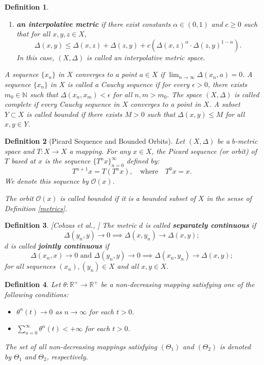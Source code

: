 \documentclass[pdflatex,sn-mathphys-num]{sn-jnl}%
\theoremstyle{thmstyleone}%
\theoremstyle{thmstyletwo}%
\theoremstyle{thmstylethree}%
\newtheorem{definition}{Definition}%
\begin{document}
\begin{definition}
\begin{enumerate}[resume]
    In this case, \( (X, \Delta) \) is called a strong \( b \)-suprametric space.
    \item \textbf{an interpolative metric} if there exist constants \( \alpha \in (0, 1) \) and \( c \geq 0 \) such that for all \( x, y, z \in X \),
    \[
    \Delta(x, y) \leq \Delta(x, z) + \Delta(z, y) + c \left( \Delta(x, z)^\alpha \cdot \Delta(z, y)^{1-\alpha} \right).
    \]
    In this case, \( (X, \Delta) \) is called an interpolative metric space.
\end{enumerate}
A sequence \( \{x_n\} \) in \( X \) converges to a point \( a \in X \) if \( \lim_{n \to \infty} \Delta(x_n, a) = 0 \). A sequence \( \{x_n\} \) in \( X \) is called a Cauchy sequence if for every \( \epsilon > 0 \), there exists \( m_0 \in \mathbb{N} \) such that \( \Delta(x_n, x_m) < \epsilon \) for all \( n, m > m_0 \). The space \( (X, \Delta) \) is called complete if every Cauchy sequence in \( X \) converges to a point in \( X \). A subset $Y\subset X$ is called bounded if there exists $M>0$ such that $\Delta(x,y)\leq M$ for all $x,y\in Y$.
\end{definition}
\begin{definition}[Picard Sequence and Bounded Orbits]
Let $(X,\Delta)$ be a $b$-metric space and $T: X\to X$ a mapping. For any $x \in X$, the \emph{Picard sequence} (or \emph{orbit}) of $T$ based at $x$ is the sequence $\{T^n x\}_{n=0}^\infty$ defined by:
\[
T^{n+1}x = T(T^n x), \quad \text{where} \quad T^0 x = x.
\]
We denote this sequence by $\mathcal{O}(x)$. 

The orbit $\mathcal{O}(x)$ is called \emph{bounded} if it is a bounded subset of $X$ in the sense of Definition \ref{metrics}. 
\end{definition}
\begin{definition}\label{continuity}[Cobzas et al., \cite{cobzas2020completion}]
The metric \( d \) is called \textbf{separately continuous} if
\[
\Delta(y_n, y) \to 0 \implies \Delta(x, y_n) \to \Delta(x, y);
\]
\( d \) is called \textbf{jointly continuous} if
\[
\Delta(x_n, x) \to 0 \text{ and } \Delta(y_n, y) \to 0 \implies \Delta(x_n, y_n) \to \Delta(x, y);
\]
for all sequences \( (x_n), (y_n) \in X \) and all \( x, y \in X \).
\end{definition}

\begin{definition}
Let \( \theta : \mathbb{R}^{+} \to \mathbb{R}^{+} \) be a non-decreasing mapping satisfying one of the following conditions:
\begin{itemize}
    \item[\((\Theta_1)\)] \( \theta^{n}(t) \to 0 \) as \( n \to \infty \) for each \( t > 0 \).
    \item[\((\Theta_2)\)] \( \sum_{n=0}^{\infty} \theta^{n}(t) < +\infty \) for each \( t > 0 \).
\end{itemize}
The set of all non-decreasing mappings satisfying \( (\Theta_1) \) and \( (\Theta_2) \) is denoted by \( \Theta_1 \) and \( \Theta_2 \), respectively.
\end{definition}
\end{document}
